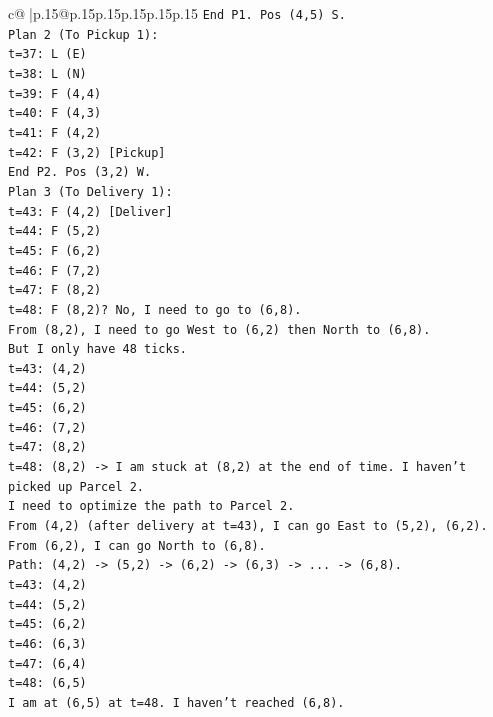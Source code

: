 \documentclass{article}
\begin{document}
{\begin{supertabular}{c@{$\;$}|p{.15\linewidth}@{}p{.15\linewidth}p{.15\linewidth}p{.15\linewidth}p{.15\linewidth}p{.15\linewidth}}
{{{\texttt{End P1. Pos (4,5) S.} \\
\texttt{Plan 2 (To Pickup 1):} \\
\texttt{t=37: L (E)} \\
\texttt{t=38: L (N)} \\
\texttt{t=39: F (4,4)} \\
\texttt{t=40: F (4,3)} \\
\texttt{t=41: F (4,2)} \\
\texttt{t=42: F (3,2) {[}Pickup{]}} \\
\texttt{End P2. Pos (3,2) W.} \\
\texttt{Plan 3 (To Delivery 1):} \\
\texttt{t=43: F (4,2) {[}Deliver{]}} \\
\texttt{t=44: F (5,2)} \\
\texttt{t=45: F (6,2)} \\
\texttt{t=46: F (7,2)} \\
\texttt{t=47: F (8,2)} \\
\texttt{t=48: F (8,2)? No, I need to go to (6,8).} \\
\texttt{From (8,2), I need to go West to (6,2) then North to (6,8).} \\
\texttt{But I only have 48 ticks.} \\
\texttt{t=43: (4,2)} \\
\texttt{t=44: (5,2)} \\
\texttt{t=45: (6,2)} \\
\texttt{t=46: (7,2)} \\
\texttt{t=47: (8,2)} \\
\texttt{t=48: (8,2) {-}> I am stuck at (8,2) at the end of time. I haven't picked up Parcel 2.} \\
\texttt{I need to optimize the path to Parcel 2.} \\
\texttt{From (4,2) (after delivery at t=43), I can go East to (5,2), (6,2).} \\
\texttt{From (6,2), I can go North to (6,8).} \\
\texttt{Path: (4,2) {-}> (5,2) {-}> (6,2) {-}> (6,3) {-}> ... {-}> (6,8).} \\
\texttt{t=43: (4,2)} \\
\texttt{t=44: (5,2)} \\
\texttt{t=45: (6,2)} \\
\texttt{t=46: (6,3)} \\
\texttt{t=47: (6,4)} \\
\texttt{t=48: (6,5)} \\
\texttt{I am at (6,5) at t=48. I haven't reached (6,8).} \\
}}}
\end{supertabular}}
\end{document}
